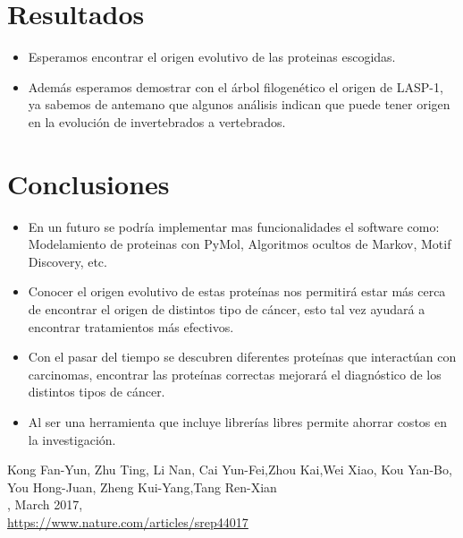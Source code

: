 \documentclass[twocolumn,twoside,12pt]{article}
\begin{document}
\begin{itemize}
\begin{lstlisting}[frame=single]
\end{lstlisting}	

\normalsize
\section{Resultados}
\begin{itemize}
	\item Esperamos encontrar el origen evolutivo de las proteinas escogidas.
	    
    \item Adem\'as esperamos demostrar con el \'arbol filogen\'etico el origen de LASP-1, ya sabemos de antemano que algunos an\'alisis indican que puede tener origen en la evoluci\'on de invertebrados a vertebrados.	
    
\end{itemize}

\section{Conclusiones}

\begin{itemize}
\item En un futuro se podr\'ia implementar mas funcionalidades el software como: Modelamiento de proteinas con PyMol, Algoritmos ocultos de Markov, Motif Discovery, etc.
\item Conocer el origen evolutivo de estas prote\'inas nos permitir\'a estar m\'as cerca de encontrar el origen de  distintos tipo de c\'ancer, esto tal vez ayudar\'a a encontrar tratamientos m\'as efectivos.
\item Con el pasar del tiempo se descubren diferentes prote\'inas que interact\'uan con carcinomas, encontrar las prote\'inas correctas mejorar\'a el diagn\'ostico de los distintos tipos de c\'ancer.
\item Al ser una herramienta que incluye librer\'ias libres permite ahorrar costos en la investigaci\'on.  

\end{itemize}


\begin{thebibliography}{X}

	Kong Fan-Yun, Zhu Ting, Li Nan, Cai Yun-Fei,Zhou Kai,Wei Xiao, Kou Yan-Bo, You Hong-Juan, Zheng   
	Kui-Yang,Tang Ren-Xian\\
,
 March 2017,\\
\url{https://www.nature.com/articles/srep44017}


\end{thebibliography}
\end{itemize}
\end{document}
